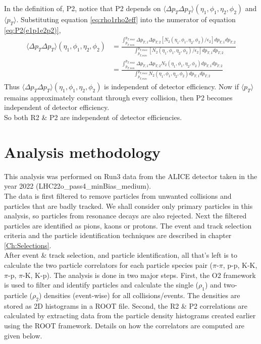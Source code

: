 \documentclass[12pt,a4paper,twoside]{report}
\begin{document}
In the definition of, P2, notice that P2 depends on $\langle\Delta p_T \Delta p_T\rangle(\eta_1,\phi_1,\eta_2,\phi_2)$ and $\langle p_T\rangle$. 
Substituting equation \ref{eq:rho1rho2eff} into the numerator of equation \ref{eq:P2(e1p1e2p2)},
\begin{align}\nonumber
	\langle\Delta p_T \Delta p_T\rangle(\eta_1,\phi_1,\eta_2,\phi_2)&=\frac{\int_{p_{T,min}}^{p_{T,max}}\Delta p_{T,1}\Delta p_{T,2}[N_2(\eta_1,\phi_1,\eta_2,\phi_2)/\epsilon_2]d p_{T,1}d p_{T,2}}{\int_{p_{T,min}}^{p_{T,max}}[N_2(\eta_1,\phi_1,\eta_2,\phi_2)/\epsilon_2]d p_{T,1}d p_{T,2}}\\&=\frac{\int_{p_{T,min}}^{p_{T,max}}\Delta p_{T,1}\Delta p_{T,2}N_2(\eta_1,\phi_1,\eta_2,\phi_2)d p_{T,1}d p_{T,2}}{\int_{p_{T,min}}^{p_{T,max}}N_2(\eta_1,\phi_1,\eta_2,\phi_2)d p_{T,1}d p_{T,2}}
\end{align}
Thus $\langle\Delta p_T \Delta p_T\rangle(\eta_1,\phi_1,\eta_2,\phi_2)$ is independent of detector efficiency. Now if $\langle p_T\rangle$ remains approximately constant through every collision, then P2 becomes independent of detector efficiency.\\

So both R2 \& P2 are independent of detector efficiencies.

\chapter{Analysis methodology}\label{Ch:Methodology}
This analysis was performed on Run3 data from the ALICE detector taken in the year 2022 (LHC22o\_pass4\_minBias\_medium).\\ 

The data is first filtered to remove particles from unwanted collisions and particles that are badly tracked. We shall consider only primary particles in this analysis, so particles from resonance decays are also rejected. Next the filtered particles are identified as pions, kaons or protons. The event and track selection criteria and the particle identification techniques are described in chapter \ref{Ch:Selections}.\\

After event \& track selection, and particle identification, all that's left is to calculate the two particle correlators for each particle species pair ($\pi$-$\pi$, p-p, K-K, $\pi$-p, $\pi$-K, K-p). The analysis is done in two major steps. First, the O2 framework is used to filter and identify particles and calculate the single ($\rho_1$) and two-particle ($\rho_2$) densities (event-wise) for all collisions/events. The densities are stored as 2D histograms in a ROOT file. Second, the R2 \& P2 correlations are calculated by extracting data from the particle density histograms created earlier using the ROOT framework. Details on how the correlators are computed are given below.\\
 
\end{document}
